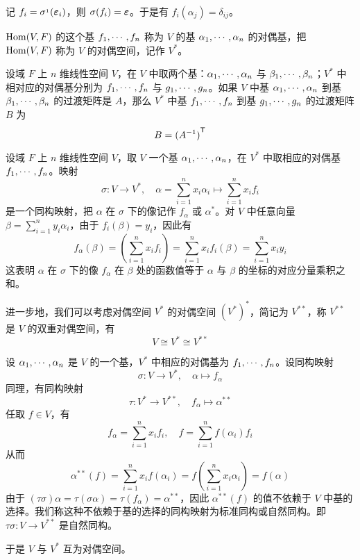 记 $f_i = \sigma^{_1}(\boldsymbol{\varepsilon}_i)$，则 $\sigma(f_i) = \boldsymbol{\varepsilon}$。于是有 $f_i(\alpha_j) = \delta_{ij}$。

$\operatorname{Hom}(V,F)$ 的这个基 $f_1,\cdots,f_n$ 称为 $V$ 的基 $\alpha_1,\cdots,\alpha_n$ 的对偶基，把 $\operatorname{Hom}(V,F)$ 称为 $V$ 的对偶空间，记作 $V^*$。

\begin{theorem}
	设域 $F$ 上 $n$ 维线性空间 $V$，在 $V$ 中取两个基：$\alpha_1,\cdots,\alpha_n$ 与 $\beta_1,\cdots,\beta_n$；$V^*$ 中相对应的对偶基分别为 $f_1,\cdots,f_n$ 与 $g_1,\cdots,g_n$。如果 $V$ 中基 $\alpha_1,\cdots,\alpha_n$ 到基 $\beta_1,\cdots,\beta_n$ 的过渡矩阵是 $A$，那么 $V^*$ 中基 $f_1,\cdots,f_n$ 到基 $g_1,\cdots,g_n$ 的过渡矩阵 $B$ 为
	\[ B = {(A^{-1})}^\mathsf{T} \]
\end{theorem}

设域 $F$ 上 $n$ 维线性空间 $V$，取 $V$ 一个基 $\alpha_1,\cdots,\alpha_n$，在 $V^*$ 中取相应的对偶基 $f_1,\cdots,f_n$。映射
\[ \sigma : V \to V^*, \quad \alpha = \sum_{i=1}^n x_i\alpha_i \mapsto \sum_{i=1}^n x_if_i \]
是一个同构映射，把 $\alpha$ 在 $\sigma$ 下的像记作 $f_\alpha$ 或 $\alpha^*$。对 $V$ 中任意向量 $\beta = \sum_{i=1}^n y_i\alpha_i$，由于 $f_i(\beta) = y_i$，因此有
\[ f_\alpha(\beta) = \left( \sum_{i=1}^n x_if_i \right) = \sum_{i=1}^n x_if_i(\beta) = \sum_{i=1}^n x_iy_i \]
这表明 $\alpha$ 在 $\sigma$ 下的像 $f_\alpha$ 在 $\beta$ 处的函数值等于 $\alpha$ 与 $\beta$ 的坐标的对应分量乘积之和。

进一步地，我们可以考虑对偶空间 $V^*$ 的对偶空间 $(V^*)^*$，简记为 $V^{**}$，称 $V^{**}$ 是 $V$ 的双重对偶空间，有
\[ V \cong V^{*} \cong V^{**} \]

设 $\alpha_1,\cdots,\alpha_n$ 是 $V$ 的一个基，$V^*$ 中相应的对偶基为 $f_1,\cdots,f_n$。设同构映射 
\[ \sigma : V \to V^*, \quad \alpha \mapsto f_\alpha \]
同理，有同构映射
\[ \tau : V^* \to V^{**}, \quad f_\alpha \mapsto \alpha^{**} \]
任取 $f \in V$，有
\[ f_\alpha = \sum_{i=1}^n x_if_i, \quad f = \sum_{i=1}^n f(\alpha_i) f_i \]
从而
\[ \alpha^{**}(f) = \sum_{i=1}^n x_if(\alpha_i) = f\left( \sum_{i=1}^n x_i\alpha_i \right) = f(\alpha) \]
由于  $(\tau\sigma)\alpha = \tau(\sigma\alpha) = \tau(f_\alpha) = \alpha^{**}$，因此 $\alpha^{**}(f)$ 的值不依赖于 $V$ 中基的选择。我们称这种不依赖于基的选择的同构映射为标准同构或自然同构。即 $\tau\sigma : V \to V^{**}$ 是自然同构。

于是 $V$ 与 $V^{*}$ 互为对偶空间。
